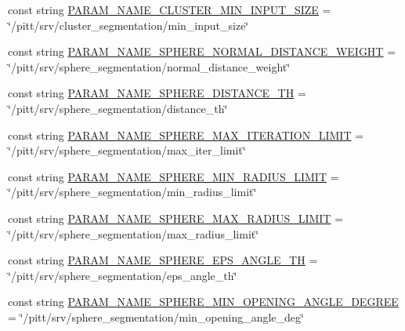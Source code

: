 \begin{DoxyCompactItemize}
\item 
const string \hyperlink{namespacesrvm_a3f21a743638bc9a2a5fbfbc5711e4095}{P\-A\-R\-A\-M\-\_\-\-N\-A\-M\-E\-\_\-\-C\-L\-U\-S\-T\-E\-R\-\_\-\-M\-I\-N\-\_\-\-I\-N\-P\-U\-T\-\_\-\-S\-I\-Z\-E} = \char`\"{}/pitt/srv/cluster\-\_\-segmentation/min\-\_\-input\-\_\-size\char`\"{}
\item 
const string \hyperlink{namespacesrvm_ae88e28586870382fc0b407646869f0c4}{P\-A\-R\-A\-M\-\_\-\-N\-A\-M\-E\-\_\-\-S\-P\-H\-E\-R\-E\-\_\-\-N\-O\-R\-M\-A\-L\-\_\-\-D\-I\-S\-T\-A\-N\-C\-E\-\_\-\-W\-E\-I\-G\-H\-T} = \char`\"{}/pitt/srv/sphere\-\_\-segmentation/normal\-\_\-distance\-\_\-weight\char`\"{}
\item 
const string \hyperlink{namespacesrvm_aacb054d1f0139845cf32c294b210b96c}{P\-A\-R\-A\-M\-\_\-\-N\-A\-M\-E\-\_\-\-S\-P\-H\-E\-R\-E\-\_\-\-D\-I\-S\-T\-A\-N\-C\-E\-\_\-\-T\-H} = \char`\"{}/pitt/srv/sphere\-\_\-segmentation/distance\-\_\-th\char`\"{}
\item 
const string \hyperlink{namespacesrvm_a098cc851c26290df58470c9287263f76}{P\-A\-R\-A\-M\-\_\-\-N\-A\-M\-E\-\_\-\-S\-P\-H\-E\-R\-E\-\_\-\-M\-A\-X\-\_\-\-I\-T\-E\-R\-A\-T\-I\-O\-N\-\_\-\-L\-I\-M\-I\-T} = \char`\"{}/pitt/srv/sphere\-\_\-segmentation/max\-\_\-iter\-\_\-limit\char`\"{}
\item 
const string \hyperlink{namespacesrvm_aba736b64edcfd2a08ed56065f94d7e71}{P\-A\-R\-A\-M\-\_\-\-N\-A\-M\-E\-\_\-\-S\-P\-H\-E\-R\-E\-\_\-\-M\-I\-N\-\_\-\-R\-A\-D\-I\-U\-S\-\_\-\-L\-I\-M\-I\-T} = \char`\"{}/pitt/srv/sphere\-\_\-segmentation/min\-\_\-radius\-\_\-limit\char`\"{}
\item 
const string \hyperlink{namespacesrvm_ac79f9145796395f45f9c06cefc6876aa}{P\-A\-R\-A\-M\-\_\-\-N\-A\-M\-E\-\_\-\-S\-P\-H\-E\-R\-E\-\_\-\-M\-A\-X\-\_\-\-R\-A\-D\-I\-U\-S\-\_\-\-L\-I\-M\-I\-T} = \char`\"{}/pitt/srv/sphere\-\_\-segmentation/max\-\_\-radius\-\_\-limit\char`\"{}
\item 
const string \hyperlink{namespacesrvm_aac6381551a69b2d103ccdb9aeefcfa1d}{P\-A\-R\-A\-M\-\_\-\-N\-A\-M\-E\-\_\-\-S\-P\-H\-E\-R\-E\-\_\-\-E\-P\-S\-\_\-\-A\-N\-G\-L\-E\-\_\-\-T\-H} = \char`\"{}/pitt/srv/sphere\-\_\-segmentation/eps\-\_\-angle\-\_\-th\char`\"{}
\item 
const string \hyperlink{namespacesrvm_a5a4d80e9cdfeb1e4a0e28c58b3ad40af}{P\-A\-R\-A\-M\-\_\-\-N\-A\-M\-E\-\_\-\-S\-P\-H\-E\-R\-E\-\_\-\-M\-I\-N\-\_\-\-O\-P\-E\-N\-I\-N\-G\-\_\-\-A\-N\-G\-L\-E\-\_\-\-D\-E\-G\-R\-E\-E} = \char`\"{}/pitt/srv/sphere\-\_\-segmentation/min\-\_\-opening\-\_\-angle\-\_\-deg\char`\"{}
\item 

\end{DoxyCompactItemize}
